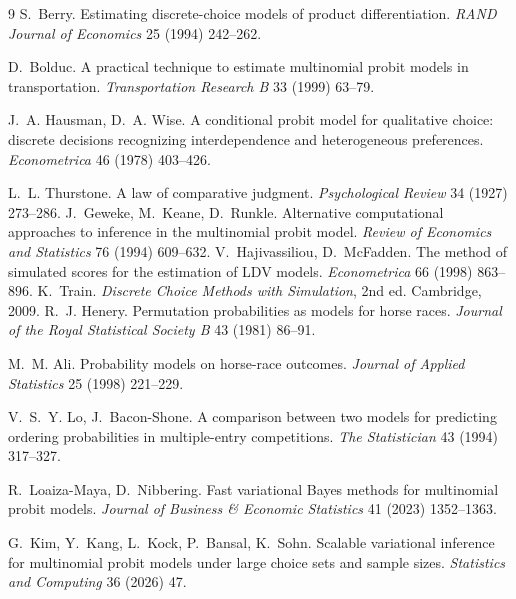 \documentclass[12pt]{article}
\theoremstyle{remark}
\begin{document}
\begin{thebibliography}{9}
 S.~Berry. Estimating discrete-choice
models of product differentiation. \emph{RAND Journal of Economics} 25
(1994) 242--262.

 D.~Bolduc. A practical technique to
estimate multinomial probit models in transportation. \emph{Transportation
Research B} 33 (1999) 63--79.

 J.~A. Hausman, D.~A.
Wise. A conditional probit model for qualitative choice: discrete
decisions recognizing interdependence and heterogeneous preferences.
\emph{Econometrica} 46 (1978) 403--426.

 L.~L. Thurstone. A law of comparative judgment.
\emph{Psychological Review} 34 (1927) 273--286.
 J.~Geweke, M.~Keane, D.~Runkle. Alternative computational
approaches to inference in the multinomial probit model. \emph{Review of
Economics and Statistics} 76 (1994) 609--632.
 V.~Hajivassiliou, D.~McFadden. The method of
simulated scores for the estimation of LDV models. \emph{Econometrica} 66
(1998) 863--896.
 K.~Train. \emph{Discrete Choice Methods with Simulation},
2nd ed. Cambridge, 2009.
 R.~J. Henery. Permutation
probabilities as models for horse races. \emph{Journal of the Royal
Statistical Society B} 43 (1981) 86--91.

 M.~M. Ali. Probability models on horse-race
outcomes. \emph{Journal of Applied Statistics} 25 (1998) 221--229.

 V.~S.~Y. Lo, J.~Bacon-Shone.
A comparison between two models for predicting ordering probabilities in
multiple-entry competitions. \emph{The Statistician} 43 (1994) 317--327.

 R.~Loaiza-Maya,
D.~Nibbering. Fast variational Bayes methods for multinomial probit
models. \emph{Journal of Business \& Economic Statistics} 41 (2023)
1352--1363.

G.~Kim, Y.~Kang, L.~Kock, P.~Bansal, K.~Sohn. Scalable variational
inference for multinomial probit models under large choice sets and
sample sizes. \emph{Statistics and Computing} 36 (2026) 47.


\end{thebibliography}
\end{document}
